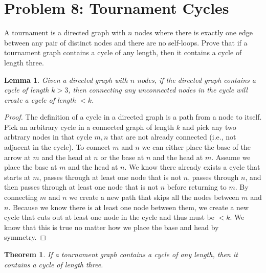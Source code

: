 \documentclass[10pt,letter]{article}
\newtheorem*{thm}{Theorem}
\newtheorem{lem}{Lemma}
\begin{document}
\pagebreak

\section*{Problem 8: Tournament Cycles}
A tournament is a directed graph with $n$ nodes where there is exactly one edge between any pair of distinct nodes and there are no self-loops. Prove that if a tournament graph contains a cycle of any length, then it contains a cycle of length three.

\begin{lem} \label{lem:q8_1} Given a directed graph with $n$ nodes, if the directed graph contains a cycle of length $k > 3$, then connecting any unconnected nodes in the cycle will create a cycle of length $< k$.
\end{lem}

\begin{proof} The definition of a cycle in a directed graph is a path from a node to itself. Pick an arbitrary cycle in a connected graph of length $k$ and pick any two arbtrary nodes in that cycle $m, n$ that are not already connected (i.e., not adjacent in the cycle). To connect $m$ and $n$ we can either place the base of the arrow at $m$ and the head at $n$ or the base at $n$ and the head at $m$. Assume we place the base at $m$ and the head at $n$. We know there already exists a cycle that starts at $m$, passes through at least one node that is not $n$, passes through $n$, and then passes through at least one node that is not $n$ before returning to $m$. By connecting $m$ and $n$ we create a new path that skips all the nodes between $m$ and $n$. Because we know there is at least one node between them, we create a new cycle that cuts out at least one node in the cycle and thus must be $< k$. We know that this is true no matter how we place the base and head by symmetry.
\end{proof}

\begin{thm} If a tournament graph contains a cycle of any length, then it contains a cycle of length three.
\end{thm}
\end{document}
